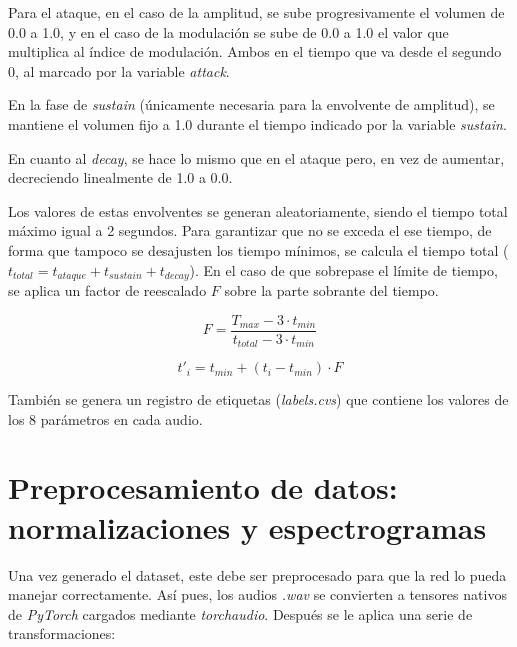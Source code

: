 Para el ataque, en el caso de la amplitud, se sube progresivamente el volumen de 0.0 a 1.0, y en el caso de la modulación se sube de 0.0 a 1.0 el valor que multiplica al índice de modulación. Ambos en el tiempo que va desde el segundo 0, al marcado por la variable \textit{attack}.

En la fase de \textit{sustain} (únicamente necesaria para la envolvente de amplitud), se mantiene el volumen fijo a 1.0 durante el tiempo indicado por la variable \textit{sustain}.

En cuanto al \textit{decay}, se hace lo mismo que en el ataque pero, en vez de aumentar, decreciendo linealmente de 1.0 a 0.0.

Los valores de estas envolventes se generan aleatoriamente, siendo el tiempo total máximo igual a 2 segundos. Para garantizar que no se exceda el ese tiempo, de forma que tampoco se desajusten los tiempo mínimos, se calcula el tiempo total ($t_{total} = t_{ataque} + t_{sustain} + t_{decay}$). En el caso de que sobrepase el límite de tiempo, se aplica un factor de reescalado $F$ sobre la parte sobrante del tiempo.

\begin{equation}
F = \frac{T_{max} - 3 \cdot t_{min}}{t_{total} - 3 \cdot t_{min}}
\label{eq:factor_reescalado}
\end{equation}

\begin{equation}
t'_i = t_{min} + (t_i - t_{min}) \cdot F
\label{eq:reescalado}
\end{equation}

También se genera un registro de etiquetas (\textit{labels.cvs}) que contiene los valores de los 8 parámetros en cada audio.

\section{Preprocesamiento de datos: normalizaciones y espectrogramas}
\label{sec:Preprocesamiento}

Una vez generado el dataset, este debe ser preprocesado para que la red lo pueda manejar correctamente.
Así pues, los audios \textit{.wav} se convierten a tensores nativos de \textit{PyTorch} cargados mediante \textit{torchaudio}.
Después se le aplica una serie de transformaciones:

